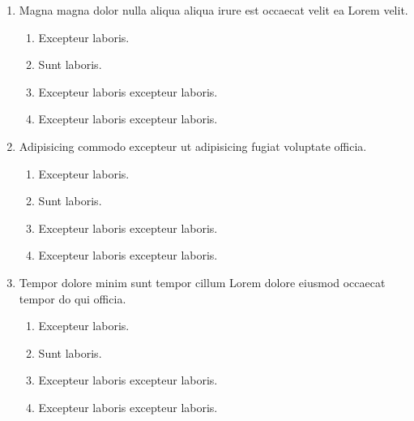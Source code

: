 \documentclass[a4paper,12pt]{article}
\begin{document}
\begin{enumerate}[label=\textbf{\arabic*.}]
\item Magna magna dolor nulla aliqua aliqua irure est occaecat velit ea Lorem velit.
\begin{multicols}{2}
	\begin{enumerate}
		\item  Excepteur laboris.
    
		\item  Sunt laboris.
    
		\item  Excepteur laboris excepteur laboris.
    
		\item  Excepteur laboris excepteur laboris.
  
	\end{enumerate}

\end{multicols}
\item Adipisicing commodo excepteur ut adipisicing fugiat voluptate officia.
\begin{multicols}{2}
	\begin{enumerate}
		\item  Excepteur laboris.
    
		\item  Sunt laboris.
    
		\item  Excepteur laboris excepteur laboris.
  
		\item  Excepteur laboris excepteur laboris.
    
	\end{enumerate}

\end{multicols}
\item Tempor dolore minim sunt tempor cillum Lorem dolore eiusmod occaecat tempor do qui officia.
\begin{multicols}{2}
	\begin{enumerate}
		\item  Excepteur laboris.
    
		\item  Sunt laboris.
    
		\item  Excepteur laboris excepteur laboris.
    
		\item  Excepteur laboris excepteur laboris.
  
	\end{enumerate}


\end{multicols}
\end{enumerate}
\end{document}
